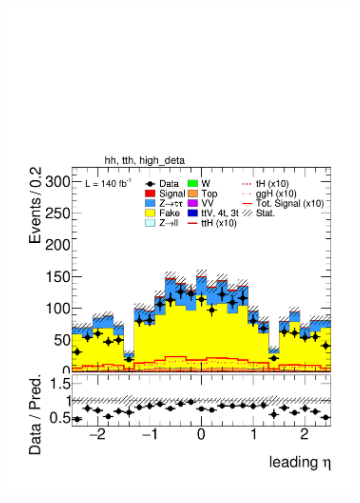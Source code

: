 \begin{figure}[htbp]
\begin{subfigure}[b]{0.45\textwidth}
          \includegraphics[width=\textwidth]{images/highdeta_highdeta_run2/plot_tau_0_eta_hh_tth_15_16_17_18_high_deta.pdf}
          \caption{}
        \end{subfigure}
    

\end{figure}
